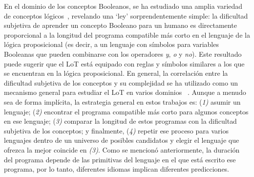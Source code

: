 
En el dominio de los conceptos Booleanos, se ha estudiado una amplia variedad de conceptos lógicos~\cite{feldman2003simplicity}, revelando una `ley' sorprendentemente simple: la dificultad subjetiva de aprender un concepto Booleano para un humano es directamente proporcional a la longitud del programa compatible más corto en el lenguaje de la lógica proposicional (es decir, a un lenguaje con símbolos para variables Booleanas que pueden combinarse con los operadores \textit{y}, \textit{o} y \textit{no}). Este resultado puede sugerir que el LoT está equipado con reglas y símbolos similares a los que se encuentran en la lógica proposicional. En general, la correlación entre la dificultad subjetiva de los conceptos y su complejidad se ha utilizado como un mecanismo general para estudiar el LoT en varios dominios ~\cite{piantadosi2016logical,leeuwenberg1971perceptual,amalric2017language,romano2018,lupyan2007language}. Aunque a menudo sea de forma implícita, la estrategia general en estos trabajos es: (\textit{1)} asumir un lenguaje; (\textit{2)} encontrar el programa compatible más corto para algunos conceptos en ese lenguaje; (\textit{3)} comparar la longitud de estos programas con la dificultad subjetiva de los conceptos; y finalmente, (\textit{4)} repetir ese proceso para varios lenguajes dentro de un universo de posibles candidatos y elegir el lenguaje que ofrezca la mejor coincide en \textit{(3)}. Como se mencionó anteriormente, la duración del programa depende de las primitivas del lenguaje en el que está escrito ese programa, por lo tanto, diferentes idiomas implican diferentes predicciones.

